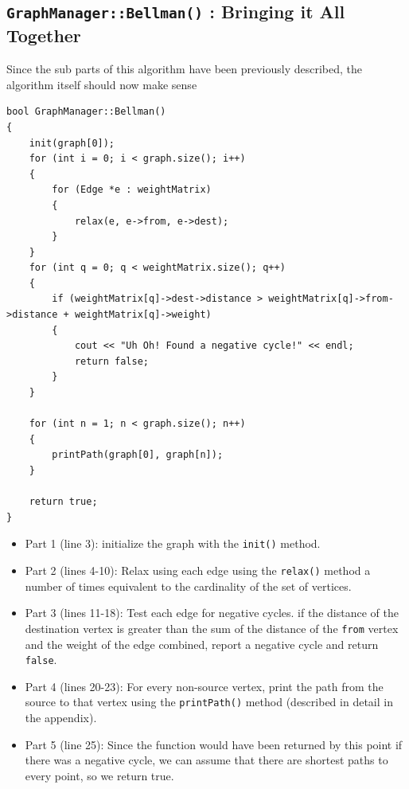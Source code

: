 \documentclass[letterpaper, 10pt]{article}
\begin{document}
\subsection{\texttt{GraphManager::Bellman()} : Bringing it All Together}

Since the sub parts of this algorithm have been previously described, the algorithm itself should now make sense
 \begin{addmargin}[-5em]{1em}
\begin{small}
\begin{verbatim}
bool GraphManager::Bellman()
{
	init(graph[0]);
	for (int i = 0; i < graph.size(); i++)
	{
		for (Edge *e : weightMatrix)
		{
			relax(e, e->from, e->dest);
		}
	}
	for (int q = 0; q < weightMatrix.size(); q++)
	{
		if (weightMatrix[q]->dest->distance > weightMatrix[q]->from->distance + weightMatrix[q]->weight)
		{
			cout << "Uh Oh! Found a negative cycle!" << endl;
			return false;
		}
	}

	for (int n = 1; n < graph.size(); n++)
	{
		printPath(graph[0], graph[n]);
	}

	return true;
}

\end{verbatim}
\end{small}
\end{addmargin}   


\begin{itemize}
    \item Part 1 (line 3): initialize the graph with the \texttt{init()} method.
    \item Part 2 (lines 4-10): Relax using each edge using the \texttt{relax()} method a number of times equivalent to the cardinality of the set of vertices.
    \item Part 3 (lines 11-18): Test each edge for negative cycles. if the distance of the destination vertex is greater than the sum of the distance of the \texttt{from} vertex and the weight of the edge combined, report a negative cycle and return \texttt{false}.
    \item Part 4 (lines 20-23): For every non-source vertex, print the path from the source to that vertex using the \texttt{printPath()} method (described in detail in the appendix).
    \item Part 5 (line 25): Since the function would have been returned by this point if there was a negative cycle, we can assume that there are shortest paths to every point, so we return true.
\end{itemize}
\end{document}
